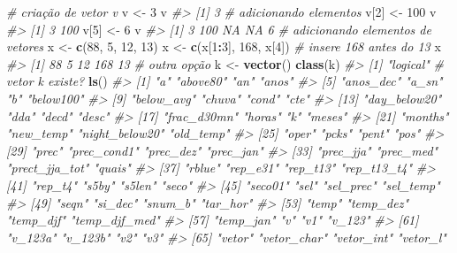 \documentclass[]{book}
\newenvironment{Shaded}{\begin{snugshade}}{\end{snugshade}}
\newcommand{\KeywordTok}[1]{\textcolor[rgb]{0.13,0.29,0.53}{\textbf{#1}}}
\newcommand{\DecValTok}[1]{\textcolor[rgb]{0.00,0.00,0.81}{#1}}
\newcommand{\StringTok}[1]{\textcolor[rgb]{0.31,0.60,0.02}{#1}}
\newcommand{\CommentTok}[1]{\textcolor[rgb]{0.56,0.35,0.01}{\textit{#1}}}
\newcommand{\OperatorTok}[1]{\textcolor[rgb]{0.81,0.36,0.00}{\textbf{#1}}}
\newcommand{\NormalTok}[1]{#1}
\begin{document}
\begin{Shaded}
\begin{Highlighting}[]
\CommentTok{# criação de vetor v}
\NormalTok{v <-}\StringTok{ }\DecValTok{3}
\NormalTok{v}
\CommentTok{#> [1] 3}
\CommentTok{# adicionando elementos}
\NormalTok{v[}\DecValTok{2}\NormalTok{] <-}\StringTok{ }\DecValTok{100}
\NormalTok{v}
\CommentTok{#> [1]   3 100}
\NormalTok{v[}\DecValTok{5}\NormalTok{] <-}\StringTok{ }\DecValTok{6}
\NormalTok{v}
\CommentTok{#> [1]   3 100  NA  NA   6}
\CommentTok{# adicionando elementos de vetores}
\NormalTok{x <-}\StringTok{ }\KeywordTok{c}\NormalTok{(}\DecValTok{88}\NormalTok{, }\DecValTok{5}\NormalTok{, }\DecValTok{12}\NormalTok{, }\DecValTok{13}\NormalTok{)}
\NormalTok{x <-}\StringTok{ }\KeywordTok{c}\NormalTok{(x[}\DecValTok{1}\OperatorTok{:}\DecValTok{3}\NormalTok{], }\DecValTok{168}\NormalTok{, x[}\DecValTok{4}\NormalTok{])  }\CommentTok{# insere 168 antes do 13}
\NormalTok{x}
\CommentTok{#> [1]  88   5  12 168  13}
\CommentTok{# outra opção}
\NormalTok{k <-}\StringTok{ }\KeywordTok{vector}\NormalTok{()}
\KeywordTok{class}\NormalTok{(k)}
\CommentTok{#> [1] "logical"}
\CommentTok{# vetor k existe?}
\KeywordTok{ls}\NormalTok{()}
\CommentTok{#>  [1] "a"             "above80"       "an"            "anos"         }
\CommentTok{#>  [5] "anos_dec"      "a_sn"          "b"             "below100"     }
\CommentTok{#>  [9] "below_avg"     "chuva"         "cond"          "cte"          }
\CommentTok{#> [13] "day_below20"   "dda"           "decd"          "desc"         }
\CommentTok{#> [17] "frac_d30mn"    "horas"         "k"             "meses"        }
\CommentTok{#> [21] "months"        "new_temp"      "night_below20" "old_temp"     }
\CommentTok{#> [25] "oper"          "pcks"          "pent"          "pos"          }
\CommentTok{#> [29] "prec"          "prec_cond1"    "prec_dez"      "prec_jan"     }
\CommentTok{#> [33] "prec_jja"      "prec_med"      "prect_jja_tot" "quais"        }
\CommentTok{#> [37] "rblue"         "rep_e31"       "rep_t13"       "rep_t13_t4"   }
\CommentTok{#> [41] "rep_t4"        "s5by"          "s5len"         "seco"         }
\CommentTok{#> [45] "seco01"        "sel"           "sel_prec"      "sel_temp"     }
\CommentTok{#> [49] "seqn"          "si_dec"        "snum_b"        "tar_hor"      }
\CommentTok{#> [53] "temp"          "temp_dez"      "temp_djf"      "temp_djf_med" }
\CommentTok{#> [57] "temp_jan"      "v"             "v1"            "v_123"        }
\CommentTok{#> [61] "v_123a"        "v_123b"        "v2"            "v3"           }
\CommentTok{#> [65] "vetor"         "vetor_char"    "vetor_int"     "vetor_l"      }

\end{Highlighting}
\end{Shaded}
\end{document}
